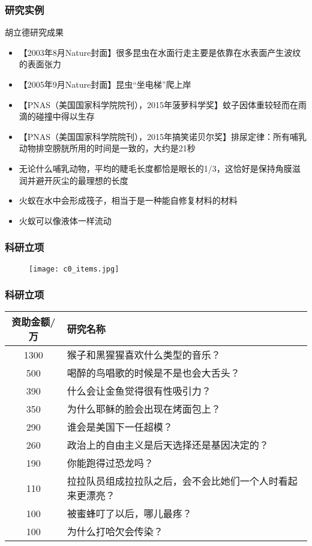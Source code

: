 \begin{frame}
  \frametitle{研究实例}
  \begin{block}{胡立德研究成果}
    \begin{itemize}
      \item 【2003年8月Nature封面】很多昆虫在水面行走主要是依靠在水表面产生波纹的表面张力
      \item 【2005年9月Nature封面】昆虫“坐电梯”爬上岸
      \item 【PNAS（美国国家科学院院刊），2015年菠萝科学奖】蚊子因体重较轻而在雨滴的碰撞中得以生存
      \item 【PNAS（美国国家科学院院刊），2015年搞笑诺贝尔奖】排尿定律：所有哺乳动物排空膀胱所用的时间是一致的，大约是21秒
      \item 无论什么哺乳动物，平均的睫毛长度都恰是眼长的1/3，这恰好是保持角膜滋润并避开灰尘的最理想的长度
      \item 火蚁在水中会形成筏子，相当于是一种能自修复材料的材料
      \item 火蚁可以像液体一样流动
    \end{itemize}
  \end{block}
\end{frame}

\begin{frame}
  \frametitle{科研立项}
  \begin{figure}
    \centering
    \texttt{[image: c0\_items.jpg]}
  \end{figure}
\end{frame}

\begin{frame}
  \frametitle{科研立项}
    \begin{table}
    \centering
    \begin{tabular}{cl}
      \hline
      \rowcolor{blue!50}资助金额/万 & 研究名称\\
      \hline
      1300 & 猴子和黑猩猩喜欢什么类型的音乐？\\
      500 & 喝醉的鸟唱歌的时候是不是也会大舌头？\\
      390 & 什么会让金鱼觉得很有性吸引力？\\
      350 & 为什么耶稣的脸会出现在烤面包上？\\
      290 & 谁会是美国下一任超模？\\
      260 & 政治上的自由主义是后天选择还是基因决定的？\\
      190 & 你能跑得过恐龙吗？\\
      110 & {\footnotesize 拉拉队员组成拉拉队之后，会不会比她们一个人时看起来更漂亮？}\\
      100 & 被蜜蜂叮了以后，哪儿最疼？\\
      100 & 为什么打哈欠会传染？\\
      \hline
    \end{tabular}
  \end{table}
\end{frame}

